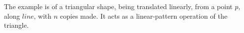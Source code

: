 %
The example is of a triangular shape, being translated linearly, from a point $p$, along $line$, with $n$ copies made. It acts as a linear-pattern operation of the triangle.

